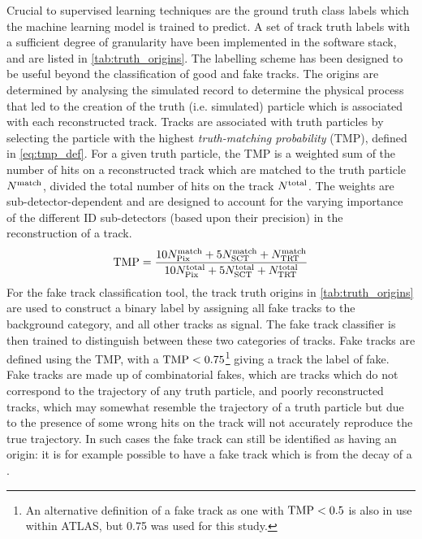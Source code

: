 Crucial to supervised learning techniques are the ground truth class labels which the machine learning model is trained to predict.
A set of track truth labels with a sufficient degree of granularity have been implemented in the \ATLAS software stack, and are listed in \cref{tab:truth_origins}.
The labelling scheme has been designed to be useful beyond the classification of good and fake tracks.
The origins are determined by analysing the simulated record to determine the physical process that led to the creation of the truth (i.e. simulated) particle which is  associated with each reconstructed track.
Tracks are associated with truth particles by selecting the particle with the highest \textit{truth-matching probability} (TMP), defined in \cref{eq:tmp_def}.
For a given truth particle, the TMP is a weighted sum of the number of hits on a reconstructed track which are matched to the truth particle $N^{\textnormal{match}}$, divided the total number of hits on the track $N^{\textnormal{total}}$.
The weights are sub-detector-dependent and are designed to account for the varying importance of the different ID sub-detectors (based upon their precision) in the reconstruction of a track.
%
\begin{equation}\label{eq:tmp_def}
    \textnormal{TMP} = 
    \frac{
        10 N_{\textnormal{Pix}}^{\textnormal{match}} + 
        5  N_{\textnormal{SCT}}^{\textnormal{match}} + 
           N_{\textnormal{TRT}}^{\textnormal{match}}
        }{
        10 N_{\textnormal{Pix}}^{\textnormal{total}} + 
        5  N_{\textnormal{SCT}}^{\textnormal{total}} + 
            N_{\textnormal{TRT}}^{\textnormal{total}}
        }
\end{equation}
%
For the fake track classification tool, the track truth origins in \cref{tab:truth_origins} are used to construct a binary label by assigning all fake tracks to the background category, and all other tracks as signal.
The fake track classifier is then trained to distinguish between these two categories of tracks.
Fake tracks are defined using the TMP, with a $\textnormal{TMP} < 0.75$\footnote{An alternative definition of a fake track as one with $\textnormal{TMP} < 0.5$ is also in use within ATLAS, but 0.75 was used for this study.}
giving a track the label of fake.
Fake tracks are made up of combinatorial fakes, which are tracks which do not correspond to the trajectory of any truth particle, and poorly reconstructed tracks, which may somewhat resemble the trajectory of a truth particle but due to the presence of some wrong hits on the track will not accurately reproduce the true trajectory.
In such cases the fake track can still be identified as having an origin: it is for example possible to have a fake track which is from the decay of a \bhadron.


